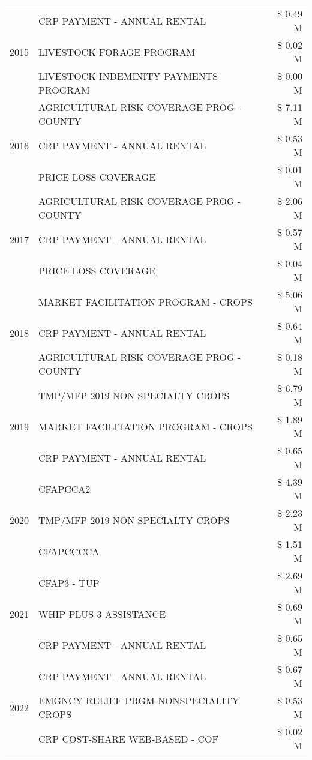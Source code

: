 \begin{tabular}{llr}
\multirow[t]{3}{*}{2015} & CRP PAYMENT - ANNUAL RENTAL & \$ 0.49 M \\
 & LIVESTOCK FORAGE PROGRAM & \$ 0.02 M \\
 & LIVESTOCK INDEMINITY PAYMENTS PROGRAM & \$ 0.00 M \\
\cline{1-3}
\multirow[t]{3}{*}{2016} & AGRICULTURAL RISK COVERAGE PROG - COUNTY & \$ 7.11 M \\
 & CRP PAYMENT - ANNUAL RENTAL & \$ 0.53 M \\
 & PRICE LOSS COVERAGE & \$ 0.01 M \\
\cline{1-3}
\multirow[t]{3}{*}{2017} & AGRICULTURAL RISK COVERAGE PROG - COUNTY & \$ 2.06 M \\
 & CRP PAYMENT - ANNUAL RENTAL & \$ 0.57 M \\
 & PRICE LOSS COVERAGE & \$ 0.04 M \\
\cline{1-3}
\multirow[t]{3}{*}{2018} & MARKET FACILITATION PROGRAM - CROPS & \$ 5.06 M \\
 & CRP PAYMENT - ANNUAL RENTAL & \$ 0.64 M \\
 & AGRICULTURAL RISK COVERAGE PROG - COUNTY & \$ 0.18 M \\
\cline{1-3}
\multirow[t]{3}{*}{2019} & TMP/MFP 2019 NON SPECIALTY CROPS & \$ 6.79 M \\
 & MARKET FACILITATION PROGRAM - CROPS & \$ 1.89 M \\
 & CRP PAYMENT - ANNUAL RENTAL & \$ 0.65 M \\
\cline{1-3}
\multirow[t]{3}{*}{2020} & CFAPCCA2 & \$ 4.39 M \\
 & TMP/MFP 2019 NON SPECIALTY CROPS & \$ 2.23 M \\
 & CFAPCCCCA & \$ 1.51 M \\
\cline{1-3}
\multirow[t]{3}{*}{2021} & CFAP3 - TUP & \$ 2.69 M \\
 & WHIP PLUS 3 ASSISTANCE & \$ 0.69 M \\
 & CRP PAYMENT - ANNUAL RENTAL & \$ 0.65 M \\
\cline{1-3}
\multirow[t]{3}{*}{2022} & CRP PAYMENT - ANNUAL RENTAL & \$ 0.67 M \\
 & EMGNCY RELIEF PRGM-NONSPECIALITY CROPS & \$ 0.53 M \\
 & CRP COST-SHARE WEB-BASED - COF & \$ 0.02 M \\
\cline{1-3}
\bottomrule
\end{tabular}
